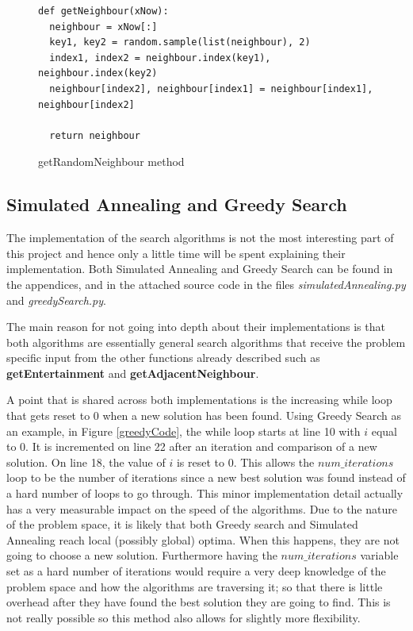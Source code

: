\documentclass[12pt]{report}
\begin{document}
\begin{figure}[H]
\caption{getRandomNeighbour method}
\label{randomNeighbour}
\begin{lstlisting}
def getNeighbour(xNow):
  neighbour = xNow[:]
  key1, key2 = random.sample(list(neighbour), 2)
  index1, index2 = neighbour.index(key1), neighbour.index(key2)
  neighbour[index2], neighbour[index1] = neighbour[index1], neighbour[index2]
    
  return neighbour
\end{lstlisting}
\end{figure}

\subsection{Simulated Annealing and Greedy Search}\label{Imp-searchAlgos}
The implementation of the search algorithms is not the most interesting part of this project and hence only a little time will be spent explaining their implementation. Both Simulated Annealing and Greedy Search can be found in the appendices, and in the attached source code in the files \textit{simulatedAnnealing.py} and \textit{greedySearch.py}.

The main reason for not going into depth about their implementations is that both algorithms are essentially general search algorithms that receive the problem specific input from the other functions already described such as \textbf{getEntertainment} and \textbf{getAdjacentNeighbour}.

A point that is shared across both implementations is the increasing while loop that gets reset to 0 when a new solution has been found. Using Greedy Search as an example, in Figure \ref{greedyCode}, the while loop starts at line 10 with $i$ equal to 0. It is incremented on line 22 after an iteration and comparison of a new solution. On line 18, the value of $i$ is reset to 0. This allows the $num\_iterations$ loop to be the number of iterations since a new best solution was found instead of a hard number of loops to go through. This minor implementation detail actually has a very measurable impact on the speed of the algorithms. Due to the nature of the problem space, it is likely that both Greedy search and Simulated Annealing reach local (possibly global) optima. When this happens, they are not going to choose a new solution. Furthermore having the $num\_iterations$ variable set as a hard number of iterations would require a very deep knowledge of the problem space and how the algorithms are traversing it; so that there is little overhead after they have found the best solution they are going to find. This is not really possible so this method also allows for slightly more flexibility.
\end{document}
